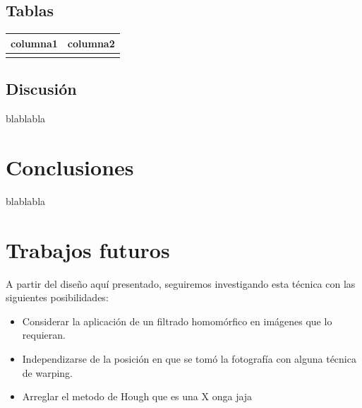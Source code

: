 \documentclass[conference,spanish,a4paper,10pt,oneside,final]{tfmpd}
\begin{document}
\subsection{Tablas}
\begin{tabular}{cc}
\hline columna1 & columna2 \\ 
\hline  &  \\ 
\hline 
\end{tabular} 
%
%
%
%
\subsection{Discusión}
blablabla
%
%
%
%
\section{Conclusiones}
blablabla
%
%
%
%
\section{Trabajos futuros}
A partir del diseño aquí presentado, seguiremos investigando esta técnica con las siguientes
posibilidades:
\begin{itemize}
\item Considerar la aplicación de un filtrado homomórfico en imágenes que lo requieran.
\item Independizarse de la posición en que se tomó la fotografía con alguna técnica de warping.
\item Arreglar el metodo de Hough que es una X onga jaja\end{itemize}

\nocite{*}


\end{document}
